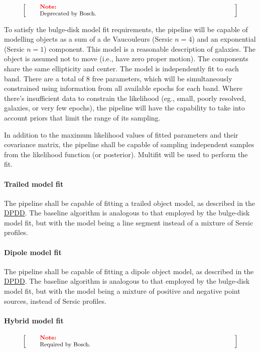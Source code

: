 \documentclass[12pt]{article}
\newcommand{\ds}[2]{{\color{blue} \href{https://docushare.lsstcorp.org/docushare/dsweb/Get/#1}{#2}}\xspace}
\newcommand{\DPDD}{\ds{LSE-163}{DPDD}}
\newenvironment{note}[1][Note]
{
  \begin{displaymath}
    \left[ \qquad
    \begin{minipage}[h]{.75\linewidth}
      \color{red} \footnotesize
      \textbf{#1:} \newline
      \color{black}
}
{
    \end{minipage}
    \normalsize
    \qquad \right]
  \end{displaymath}
}
\begin{document}
\begin{note}
Deprecated by Bosch.
\end{note}

To satisfy the bulge-disk model fit requirements, the pipeline will be capable of modelling objects as a sum of a de Vaucouleurs (Sersic $n=4$) and an exponential (Sersic $n=1$) component. This model is a reasonable description of galaxies. The object is assumed not to move (i.e., have zero proper motion). The components share the same ellipticity and center. The model is independently fit to each band. There are a total of 8 free parameters, which will be simultaneously constrained using information from all available epochs for each band. Where there's insufficient data to constrain the likelihood (eg., small, poorly resolved, galaxies, or very few epochs), the pipeline will have the capability to take into account priors that limit the range of its sampling.

In addition to the maximum likelihood values of fitted parameters and their covariance matrix, the pipeline shall be capable of sampling independent samples from the likelihood function (or posterior). Multifit will be used to perform the fit.

\paragraph{Trailed model fit}

The pipeline shall be capable of fitting a trailed object model, as described in the \DPDD{}. The baseline algorithm is analogous to that employed by the bulge-disk model fit, but with the model being a line segment instead of a mixture of Sersic profiles.

\paragraph{Dipole model fit}

The pipeline shall be capable of fitting a dipole object model, as described in the \DPDD{}. The baseline algorithm is analogous to that employed by the bulge-disk model fit, but with the model being a mixture of positive and negative point sources, instead of Sersic profiles.

\paragraph{Hybrid model fit}

\begin{note}
Required by Bosch.
\end{note}
\end{document}
